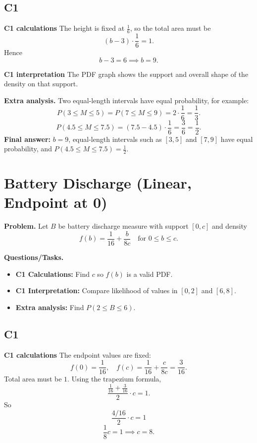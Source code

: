 	\subsection*{C1}
	
	\textbf{C1 calculations}
	The height is fixed at $\frac16$, so the total area must be
	\[
	(b-3)\cdot \frac16=1.
	\]
	Hence
	\[
	b-3=6\implies b=9.
	\]
	
	\textbf{C1 interpretation}
	The PDF graph shows the support and overall shape of the density on that support.
	
	\textbf{Extra analysis.}
	Two equal-length intervals have equal probability, for example:
	\[
	P(3\le M\le5)=P(7\le M\le9)=2\cdot\frac16=\frac13.
	\]
	\[
	P(4.5\le M\le7.5)=(7.5-4.5)\cdot\frac16=\frac{3}{6}=\frac12.
	\]
	\textbf{Final answer:} $b=9$, equal-length intervals such as $[3,5]$ and $[7,9]$ have equal probability, and $P(4.5\le M\le7.5)=\frac12$.
	
\section{Battery Discharge (Linear, Endpoint at 0)}

\textbf{Problem.}
Let $B$ be battery discharge measure with support $[0,c]$ and density
\[
f(b)=\frac{1}{16}+\frac{b}{8c}\quad\text{for }0\le b\le c.
\]

\textbf{Questions/Tasks.}
\begin{itemize}
	\item \textbf{C1 Calculations:} Find $c$ so $f(b)$ is a valid PDF.
	\item \textbf{C1 Interpretation:} Compare likelihood of values in $[0,2]$ and $[6,8]$.
	\item \textbf{Extra analysis:} Find $P(2\le B\le 6)$.
\end{itemize}

\subsection*{C1}

\textbf{C1 calculations}
The endpoint values are fixed:
\[
f(0)=\frac{1}{16},\quad f(c)=\frac{1}{16}+\frac{c}{8c}=\frac{3}{16}.
\]
Total area must be $1$. Using the trapezium formula,
\[
\frac{\frac{1}{16}+\frac{3}{16}}{2}\cdot c=1.
\]
So
\[
\frac{4/16}{2}\cdot c=1
\]
	\[
	\frac{1}{8}c=1\implies c=8.
	\]

